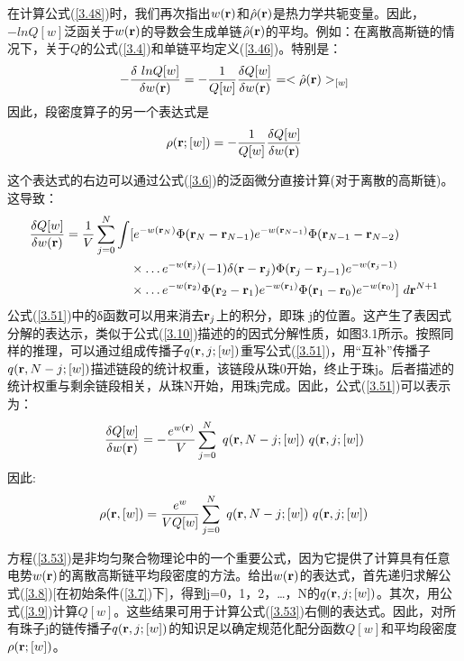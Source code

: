 在计算公式(\ref{3.48})时，我们再次指出$w(\mathbf{r})$和$\hat{\rho}(\mathbf{r})$是热力学共轭变量。因此，$-lnQ[w]$泛函关于$w(\mathbf{r})$的导数会生成单链$\hat{\rho}(\mathbf{r})$的平均。例如：在离散高斯链的情况下，关于$Q$的公式(\ref{3.4})和单链平均定义(\ref{3.46})。特别是：
\begin{equation}\label{3.49}
-\frac{\delta~lnQ[w]}{\delta w(\mathbf{r})}=-\frac{1}{Q[w]}\frac{\delta Q[w]}{\delta w(\mathbf{r})}=<\hat{\rho}(\mathbf{r})>_{[w]}
\end{equation}
因此，段密度算子的另一个表达式是
\begin{equation}\label{3.50}
\rho(\mathbf{r};[w])=-\frac{1}{Q[w]}\frac{\delta Q[w]}{\delta w(\mathbf{r})}
\end{equation}

这个表达式的右边可以通过公式(\ref{3.6})的泛函微分直接计算(对于离散的高斯链)。这导致：
\begin{equation}\label{3.51}
\begin{aligned}
\frac{\delta Q[w]}{\delta w(\mathbf{r})}=\frac{1}{V}\sum_{j=0}^{N}\int &[e^{-w(\mathbf{r}_{N})}\Phi(\mathbf{r}_{N}-\mathbf{r}_{N-1})e^{-w(\mathbf{r}_{N-1})}\Phi(\mathbf{r}_{N-1}-\mathbf{r}_{N-2}) \\ &\times \ldots e^{-w(\mathbf{r}_{j})}(-1)\delta(\mathbf{r}-\mathbf{r}_j)\Phi(\mathbf{r}_j-\mathbf{r}_{j-1})e^{-w(\mathbf{r}_j-1)}\\ & \times \ldots e^{-w(\mathbf{r}_{2})}\Phi(\mathbf{r}_{2}-\mathbf{r}_{1})e^{-w(\mathbf{r}_{1})}\Phi(\mathbf{r}_{1}-\mathbf{r}_{0})e^{-w(\mathbf{r}_{0})}]~d \mathbf{r}^{N+1}
\end{aligned}
\end{equation}
公式(\ref{3.51})中的δ函数可以用来消去$\mathbf{r}_{j}$上的积分，即珠 j的位置。这产生了表因式分解的表达示，类似于公式(\ref{3.10})描述的的因式分解性质，如图3.1所示。按照同样的推理，可以通过组成传播子$q(\mathbf{r},j;[w])$重写公式(\ref{3.51})，用“互补”传播子$q(\mathbf{r},N-j;[w])$描述链段的统计权重，该链段从珠0开始，终止于珠j。后者描述的统计权重与剩余链段相关，从珠N开始，用珠j完成。因此，公式(\ref{3.51})可以表示为：
\begin{equation}\label{3.52}
\frac{\delta Q[w]}{\delta w(\mathbf{r})}=-\frac{e^{w(\mathbf{r})}}{V}\sum_{j=0}^{N}~q(\mathbf{r},N-j;[w])~q(\mathbf{r},j;[w])
\end{equation}
因此:	
\begin{equation}\label{3.53}
\rho(\mathbf{r},[w])=\frac{e^{w}}{VQ[w]}\sum_{j=0}^{N}~q(\mathbf{r},N-j;[w])~q(\mathbf{r},j;[w])
\end{equation}

方程(\ref{3.53})是非均匀聚合物理论中的一个重要公式，因为它提供了计算具有任意电势$w(\mathbf{r})$的离散高斯链平均段密度的方法。给出$w(\mathbf{r})$的表达式，首先递归求解公式(\ref{3.8})[在初始条件(\ref{3.7})下]，得到j=0，1，2，…，N的$q(\mathbf{r},j;[w])$。其次，用公式(\ref{3.9})计算$Q[w]$。这些结果可用于计算公式(\ref{3.53})右侧的表达式。因此，对所有珠子j的链传播子$q(\mathbf{r},j;[w])$的知识足以确定规范化配分函数$Q[w]$和平均段密度$\rho(\mathbf{r};[w])$。

